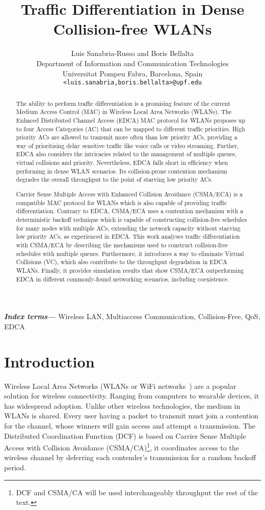 \documentclass[a4paper]{article}
\title{Traffic Differentiation in Dense Collision-free WLANs}
\author{Luis Sanabria-Russo and Boris Bellalta\\ Department of Information and Communication Technologies \\ Universitat Pompeu Fabra, Barcelona, Spain \\ \texttt{<luis.sanabria,boris.bellalta>@upf.edu}}
\providecommand{\keywords}[1]{\textbf{\textit{Index terms---}} #1}
\begin{document}
\date{}
\maketitle

\begin{abstract}
The ability to perform traffic differentiation is a promising feature of the current Medium Access Control (MAC) in Wireless Local Area Networks (WLANs). The Enhaced Distributed Channel Access (EDCA) MAC protocol for WLANs proposes up to four Access Categories (AC) that can be mapped to different traffic priorities. High priority ACs are allowed to transmit more often than low priority ACs, providing a way of prioritising delay sensitive traffic like voice calls or video streaming. Further, EDCA also considers the intricacies related to the management of multiple queues, virtual collisions and priority. Nevertheless, EDCA falls short in efficiency when performing in dense WLAN scenarios. Its collision-prone contention mechanism degrades the overall throughput to the point of starving low priority ACs.

Carrier Sense Multiple Access with Enhanced Collision Avoidance (CSMA/ECA) is a compatible MAC protocol for WLANs which is also capable of providing traffic differentiation. Contrary to EDCA, CSMA/ECA uses a contention mechanism with a deterministic backoff technique which is capable of constructing collision-free schedules for many nodes with multiple ACs, extending the network capacity without starving low priority ACs, as experienced in EDCA. This work analyses traffic differentiation with CSMA/ECA by describing the mechanisms used to construct collision-free schedules with multiple queues. Furthermore, it introduces a way to eliminate Virtual Collisions (VC), which also contribute to the throughput degradation in EDCA WLANs. Finally, it provides simulation results that show CSMA/ECA outperforming EDCA in different commonly-found networking scenarios, including coexistence.
\end{abstract}

\keywords{Wireless LAN, Multiaccess Communication, Collision-Free, QoS, EDCA}


\onehalfspacing

\section{Introduction}
Wireless Local Area Networks (WLANs or WiFi networks~\cite{802Standards}) are a popular solution for wireless connectivity. Ranging from computers to wearable devices, it has widespread adoption. Unlike other wireless technologies, the medium in WLANs is shared. Every user having a packet to transmit must join a contention for the channel, whose winners will gain access and attempt a transmission. The Distributed Coordination Function (DCF) is based on Carrier Sense Multiple Access with Collision Avoidance (CSMA/CA)\footnote{DCF and CSMA/CA will be used interchangeably throughput the rest of the text.}, it coordinates access to the wireless channel by deferring each contender's transmission for a random backoff period.
\end{document}
